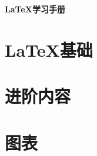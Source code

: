 \documentclass{ctexart}
\begin{document}
\begin{center}    
    \LARGE
    \bfseries
    \LaTeX 学习手册
\end{center}


\section{\LaTeX 基础}

















\section{进阶内容}











\section{图表}











\end{document}
